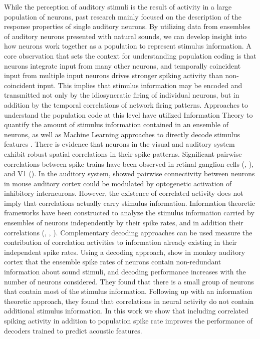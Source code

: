 While the perception of auditory stimuli is the result of activity in a large population of neurons, past research mainly focused on the description of the response properties of single auditory neurons. By utilizing data from ensembles of auditory neurons presented with natural sounds, we can develop insight into how neurons work together as a population to represent stimulus information. A core observation that sets the context for understanding population coding is that neurons integrate input from many other neurons, and temporally coincident input from multiple input neurons drives stronger spiking activity than non-coincident input. This implies that stimulus information may be encoded and transmitted not only by the idiosyncratic firing of individual neurons, but in addition by the temporal correlations of network firing patterns. Approaches to understand the population code at this level have utilized Information Theory to quantify the amount of stimulus information contained in an ensemble of neurons, as well as Machine Learning approaches to directly decode stimulus features \cite{Quiroga2009}.
There is evidence that neurons in the visual and auditory system exhibit robust spatial correlations in their spike patterns. Significant pairwise correlations between spike trains have been observed in retinal ganglion cells (\cite{Shlens2006}, \cite{Schneidman2006}), and V1 (\cite{Denman2014}). In the auditory system, \cite{Hamilton2013} showed pairwise connectivity between neurons in mouse auditory cortex could be modulated by optogenetic activation of inhibitory interneurons. However, the existence of correlated activity does not imply that correlations actually carry stimulus information. Information theoretic frameworks have been constructed to analyze the stimulus information carried by ensembles of neurons independently by their spike rates, and in addition their correlations (\cite{Panzeri2001}, \cite{Schneidman2003}, \cite{Nirenberg2003}). Complementary decoding approaches can be used measure the contribution of correlation activities to information already existing in their independent spike rates. Using a decoding approach, \cite{Ince2013} show in monkey auditory cortex that the ensemble spike rates of neurons contain non-redundant information about sound stimuli, and decoding performance increases with the number of neurons considered. They found that there is a small group of neurons that contain most of the stimulus information. Following up with an information theoretic approach, they found that correlations in neural activity do not contain additional stimulus information. In this work we show that including correlated spiking activity in addition to population spike rate improves the performance of decoders trained to predict acoustic features.
    
